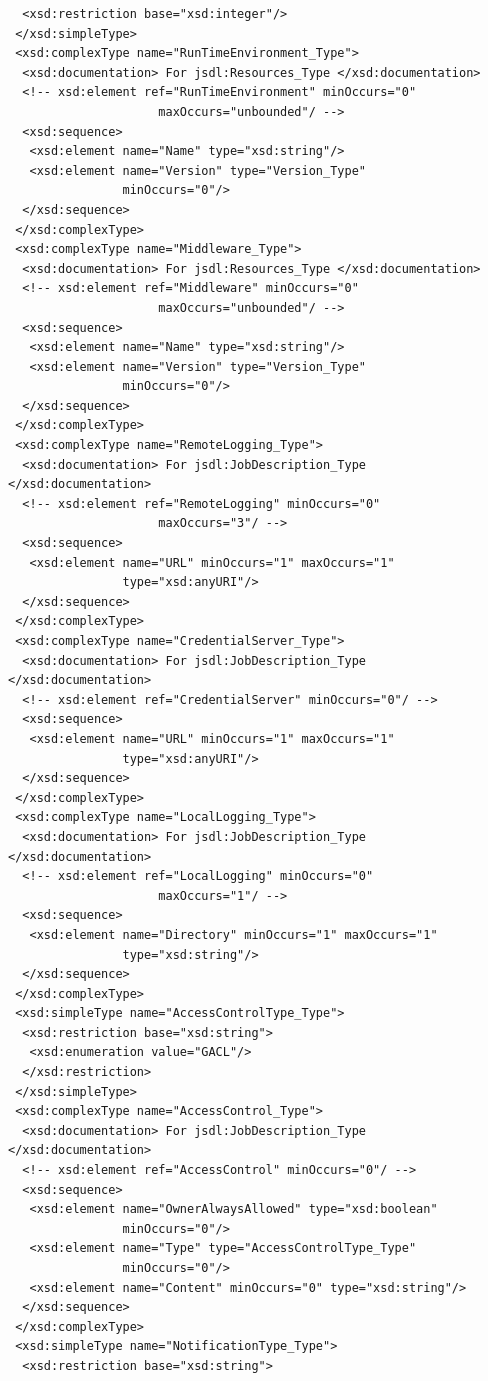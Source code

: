 \documentclass{article}                            %
\begin{document}
\begin{footnotesize}
\begin{verbatim}
  <xsd:restriction base="xsd:integer"/>
 </xsd:simpleType>
 <xsd:complexType name="RunTimeEnvironment_Type">
  <xsd:documentation> For jsdl:Resources_Type </xsd:documentation>
  <!-- xsd:element ref="RunTimeEnvironment" minOccurs="0"
                     maxOccurs="unbounded"/ -->
  <xsd:sequence>
   <xsd:element name="Name" type="xsd:string"/>
   <xsd:element name="Version" type="Version_Type"
                minOccurs="0"/>
  </xsd:sequence>
 </xsd:complexType>
 <xsd:complexType name="Middleware_Type">
  <xsd:documentation> For jsdl:Resources_Type </xsd:documentation>
  <!-- xsd:element ref="Middleware" minOccurs="0"
                     maxOccurs="unbounded"/ -->
  <xsd:sequence>
   <xsd:element name="Name" type="xsd:string"/>
   <xsd:element name="Version" type="Version_Type"
                minOccurs="0"/>
  </xsd:sequence>
 </xsd:complexType>
 <xsd:complexType name="RemoteLogging_Type">
  <xsd:documentation> For jsdl:JobDescription_Type </xsd:documentation>
  <!-- xsd:element ref="RemoteLogging" minOccurs="0"
                     maxOccurs="3"/ -->
  <xsd:sequence>
   <xsd:element name="URL" minOccurs="1" maxOccurs="1"
                type="xsd:anyURI"/>
  </xsd:sequence>
 </xsd:complexType>
 <xsd:complexType name="CredentialServer_Type">
  <xsd:documentation> For jsdl:JobDescription_Type </xsd:documentation>
  <!-- xsd:element ref="CredentialServer" minOccurs="0"/ -->
  <xsd:sequence>
   <xsd:element name="URL" minOccurs="1" maxOccurs="1"
                type="xsd:anyURI"/>
  </xsd:sequence>
 </xsd:complexType>
 <xsd:complexType name="LocalLogging_Type">
  <xsd:documentation> For jsdl:JobDescription_Type </xsd:documentation>
  <!-- xsd:element ref="LocalLogging" minOccurs="0"
                     maxOccurs="1"/ -->
  <xsd:sequence>
   <xsd:element name="Directory" minOccurs="1" maxOccurs="1"
                type="xsd:string"/>
  </xsd:sequence>
 </xsd:complexType>
 <xsd:simpleType name="AccessControlType_Type">
  <xsd:restriction base="xsd:string">
   <xsd:enumeration value="GACL"/>
  </xsd:restriction>
 </xsd:simpleType>
 <xsd:complexType name="AccessControl_Type">
  <xsd:documentation> For jsdl:JobDescription_Type </xsd:documentation>
  <!-- xsd:element ref="AccessControl" minOccurs="0"/ -->
  <xsd:sequence>
   <xsd:element name="OwnerAlwaysAllowed" type="xsd:boolean"
                minOccurs="0"/>
   <xsd:element name="Type" type="AccessControlType_Type"
                minOccurs="0"/>
   <xsd:element name="Content" minOccurs="0" type="xsd:string"/>
  </xsd:sequence>
 </xsd:complexType>
 <xsd:simpleType name="NotificationType_Type">
  <xsd:restriction base="xsd:string">

\end{verbatim}
\end{footnotesize}
\end{document}
